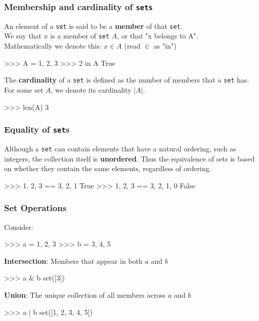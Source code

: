 \documentclass{beamer}
\begin{document}
\begin{frame}[fragile]
\frametitle{Membership and cardinality of \texttt{sets}}
An element of a \texttt{set} is said to be a \textbf{member} of that \texttt{set}.\\
    We say that $x$ is a member of \texttt{set} $A$, or that
    "x belongs to A".\\
    Mathematically we denote this: $x \in A$ (read $\in$ as "in")\\
\begin{code}
>>> A = {1, 2, 3}
>>> 2 in A
True
\end{code}

\bigskip
    The \textbf{cardinality} of a \texttt{set} is defined as the number of members that a \texttt{set} has.
    For some set $A$, we denote its cardinality $|A|$.\\
\begin{code}
>>> len(A)
3
\end{code}
\end{frame}

\begin{frame}[fragile]
\frametitle{Equality of \texttt{set}s}
Although a \texttt{set} can contain elements that have a natural ordering, such as
integers, the collection itself is \textbf{unordered}. Thus the equivalence of sets
is based on whether they contain the same elements, regardless of ordering.
\begin{code}
>>> {1, 2, 3} == {3, 2, 1}
True
>>> {1, 2, 3} == {3, 2, 1, 0}
False
\end{code}
\end{frame}


\begin{frame}[fragile]
\frametitle{Set Operations}
Consider:
\begin{code}
>>> a = {1, 2, 3}
>>> b = {3, 4, 5}
\end{code}

\vskip 0.4cm
\textbf{Intersection}: Members that appear in both $a$ and $b$
\begin{code}
>>> a & b
set([3])
\end{code}

\vskip 0.4cm
\textbf{Union}: The unique collection of all members across $a$ and $b$
\begin{code}
>>> a | b
set([1, 2, 3, 4, 5])
\end{code}
\end{frame}
\end{document}
